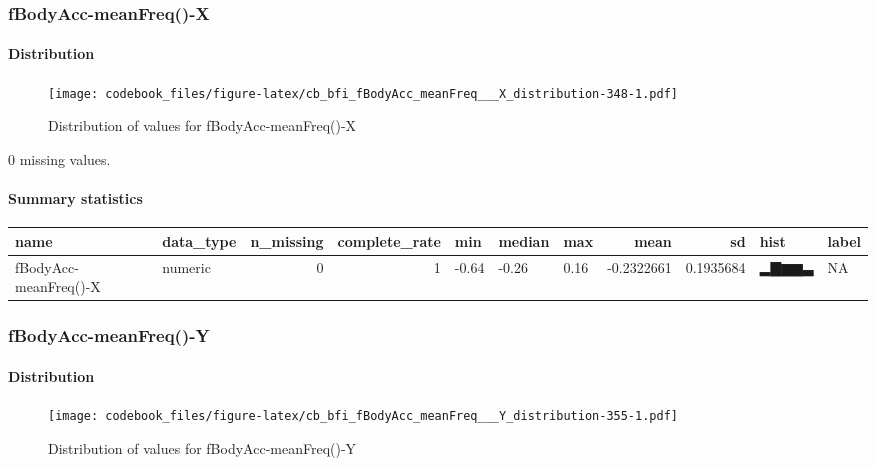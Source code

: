 \documentclass[
]{article}
\begin{document}
\hypertarget{fBodyAcc_meanFreq___X}{%
\subsubsection{fBodyAcc-meanFreq()-X}\label{fBodyAcc_meanFreq___X}}

\hypertarget{fBodyAcc_meanFreq___X_distribution}{%
\paragraph{Distribution}\label{fBodyAcc_meanFreq___X_distribution}}

\begin{figure}
\centering
\texttt{[image: codebook\_files/figure-latex/cb\_bfi\_fBodyAcc\_meanFreq\_\_\_X\_distribution-348-1.pdf]}
\caption{Distribution of values for fBodyAcc-meanFreq()-X}
\end{figure}

0 missing values.

\hypertarget{fBodyAcc_meanFreq___X_summary}{%
\paragraph{Summary statistics}\label{fBodyAcc_meanFreq___X_summary}}

\begin{longtable}[]{@{}llrrlllrrll@{}}
\toprule
name & data\_type & n\_missing & complete\_rate & min & median & max &
mean & sd & hist & label \\
\midrule
\endhead
fBodyAcc-meanFreq()-X & numeric & 0 & 1 & -0.64 & -0.26 & 0.16 &
-0.2322661 & 0.1935684 & ▂▇▆▆▃ & NA \\
\bottomrule
\end{longtable}

\hypertarget{fBodyAcc_meanFreq___Y}{%
\subsubsection{fBodyAcc-meanFreq()-Y}\label{fBodyAcc_meanFreq___Y}}

\hypertarget{fBodyAcc_meanFreq___Y_distribution}{%
\paragraph{Distribution}\label{fBodyAcc_meanFreq___Y_distribution}}

\begin{figure}
\centering
\texttt{[image: codebook\_files/figure-latex/cb\_bfi\_fBodyAcc\_meanFreq\_\_\_Y\_distribution-355-1.pdf]}
\caption{Distribution of values for fBodyAcc-meanFreq()-Y}
\end{figure}
\end{document}
